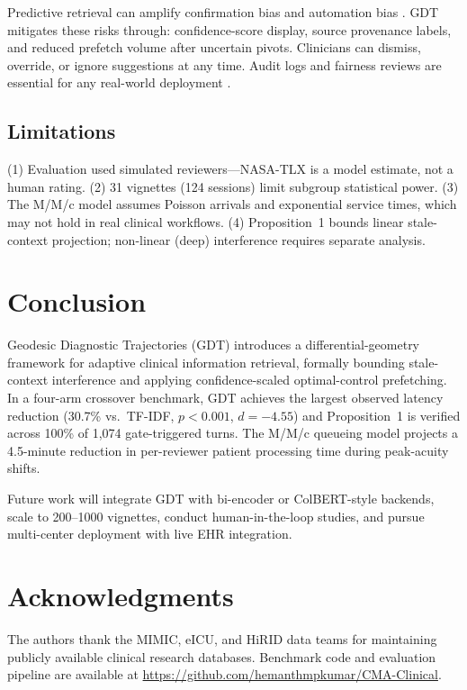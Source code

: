 \documentclass[11pt,a4paper]{article}
\begin{document}
Predictive retrieval can amplify confirmation bias and automation bias \cite{croskerry2003,goddard2012}. GDT mitigates these risks through: confidence-score display, source provenance labels, and reduced prefetch volume after uncertain pivots. Clinicians can dismiss, override, or ignore suggestions at any time. Audit logs and fairness reviews are essential for any real-world deployment \cite{lekadir25,amann20}.

\subsection{Limitations}

(1) Evaluation used simulated reviewers---NASA-TLX is a model estimate, not a human rating. (2) 31 vignettes (124 sessions) limit subgroup statistical power. (3) The M/M/c model assumes Poisson arrivals and exponential service times, which may not hold in real clinical workflows. (4) Proposition~1 bounds linear stale-context projection; non-linear (deep) interference requires separate analysis.

\section{Conclusion}
\label{sec:conclusion}

Geodesic Diagnostic Trajectories (GDT) introduces a differential-geometry framework for adaptive clinical information retrieval, formally bounding stale-context interference and applying confidence-scaled optimal-control prefetching. In a four-arm crossover benchmark, GDT achieves the largest observed latency reduction (30.7\% vs.\ TF-IDF, $p{<}0.001$, $d{=}{-4.55}$) and Proposition~1 is verified across 100\% of 1,074 gate-triggered turns. The M/M/c queueing model projects a 4.5-minute reduction in per-reviewer patient processing time during peak-acuity shifts.

Future work will integrate GDT with bi-encoder or ColBERT-style \cite{khattab20} backends, scale to 200--1000 vignettes, conduct human-in-the-loop studies, and pursue multi-center deployment with live EHR integration.

\section*{Acknowledgments}

The authors thank the MIMIC, eICU, and HiRID data teams for maintaining publicly available clinical research databases. Benchmark code and evaluation pipeline are available at \url{https://github.com/hemanthmpkumar/CMA-Clinical}.



\end{document}
